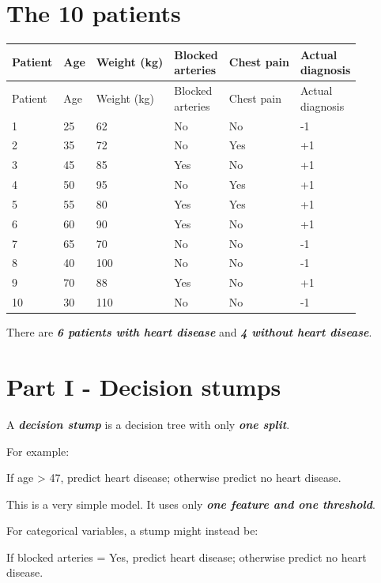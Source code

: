 \documentclass{course_sheet}
\begin{document}
\section*{The 10 patients}
\begingroup
\small
\setlength{\tabcolsep}{4pt}
\begin{longtable}{l|l|l|l|l|l}
Patient & Age & Weight (kg) & \shortstack[l]{Blocked \\ arteries} & Chest pain & \shortstack[l]{Actual \\ diagnosis} \\[1.5pt]
\hline
\endfirsthead
Patient & Age & Weight (kg) & \shortstack[l]{Blocked \\ arteries} & Chest pain & \shortstack[l]{Actual \\ diagnosis} \\[1.5pt]
\hline
\endhead
1 & 25 & 62 & No & No & -1 \\[1.5pt]
2 & 35 & 72 & No & Yes & +1 \\[1.5pt]
3 & 45 & 85 & Yes & No & +1 \\[1.5pt]
4 & 50 & 95 & No & Yes & +1 \\[1.5pt]
5 & 55 & 80 & Yes & Yes & +1 \\[1.5pt]
6 & 60 & 90 & Yes & No & +1 \\[1.5pt]
7 & 65 & 70 & No & No & -1 \\[1.5pt]
8 & 40 & 100 & No & No & -1 \\[1.5pt]
9 & 70 & 88 & Yes & No & +1 \\[1.5pt]
10 & 30 & 110 & No & No & -1 \\[1.5pt]
\end{longtable}
\endgroup
There are \textbf{\textit{6 patients with heart disease}} and \textbf{\textit{4 without heart disease}}.

\clearpage
\section*{Part I - Decision stumps}
A \textbf{\textit{decision stump}} is a decision tree with only \textbf{\textit{one split}}.

For example:

If age > 47, predict heart disease; otherwise predict no heart disease.

This is a very simple model. It uses only \textbf{\textit{one feature and one threshold}}.

For categorical variables, a stump might instead be:

If blocked arteries = Yes, predict heart disease; otherwise predict no heart disease.
\end{document}

